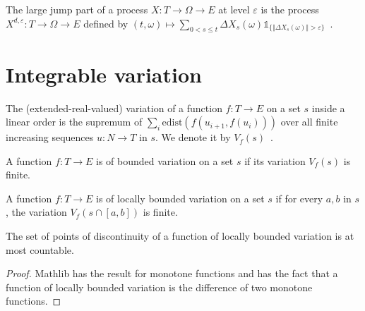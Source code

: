 \begin{definition}\label{def:largeJump}
The large jump part of a process $X : T \to \Omega \to E$ at level $\varepsilon$ is the process $X^{d, \varepsilon} : T \to \Omega \to E$ defined by $(t, \omega) \mapsto \sum_{0 < s \le t} \Delta X_s(\omega) \mathbb{1}_{\{\Vert \Delta X_s(\omega) \Vert > \varepsilon\}}$~.
\end{definition}


\section{Integrable variation}

\begin{definition}\label{def:eVariationOn}
  \mathlibok
The (extended-real-valued) variation of a function $f : T \to E$ on a set $s$ inside a linear order is the supremum of $\sum_i \mathrm{edist}(f(u_{i+1}, f(u_i)))$ over all finite increasing sequences $u : N \to T$ in $s$.
We denote it by $V_f(s)$~.
\end{definition}


\begin{definition}\label{def:BoundedVariationOn}
  \mathlibok
A function $f : T \to E$ is of bounded variation on a set $s$ if its variation $V_f(s)$ is finite.
\end{definition}


\begin{definition}\label{def:LocallyBoundedVariationOn}
  \mathlibok
A function $f : T \to E$ is of locally bounded variation on a set $s$ if for every $a, b$ in $s$, the variation $V_f(s \cap [a, b])$ is finite.
\end{definition}


\begin{lemma}\label{lem:LocallyBoundedVariationOn.countable_not_continuous_at}
The set of points of discontinuity of a function of locally bounded variation is at most countable.
\end{lemma}

\begin{proof}
Mathlib has the result for monotone functions and has the fact that a function of locally bounded variation is the difference of two monotone functions.
\end{proof}



